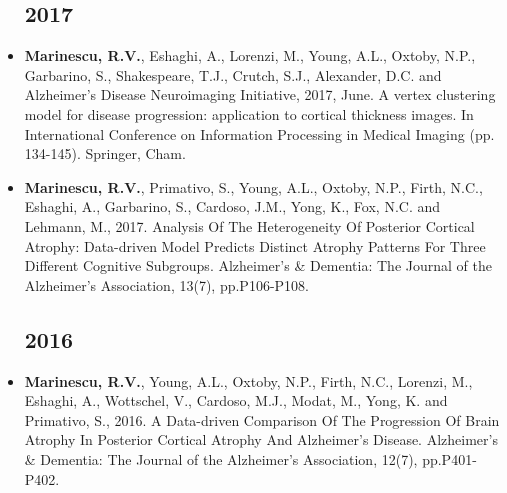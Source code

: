 \documentclass[a4paper,10pt]{article} %
\begin{document}
\begin{itemize}
\subsection*{2017}
\item[\talk] \textbf{Marinescu, R.V.}, Eshaghi, A., Lorenzi, M., Young, A.L., Oxtoby, N.P., Garbarino, S., Shakespeare, T.J., Crutch, S.J., Alexander, D.C. and Alzheimer’s Disease Neuroimaging Initiative, 2017, June. A vertex clustering model for disease progression: application to cortical thickness images. In International Conference on Information Processing in Medical Imaging (pp. 134-145). Springer, Cham.
\item[\poster] \textbf{Marinescu, R.V.}, Primativo, S., Young, A.L., Oxtoby, N.P., Firth, N.C., Eshaghi, A., Garbarino, S., Cardoso, J.M., Yong, K., Fox, N.C. and Lehmann, M., 2017. Analysis Of The Heterogeneity Of Posterior Cortical Atrophy: Data-driven Model Predicts Distinct Atrophy Patterns For Three Different Cognitive Subgroups. Alzheimer's \& Dementia: The Journal of the Alzheimer's Association, 13(7), pp.P106-P108.
\subsection*{2016}
\item[\poster] \textbf{Marinescu, R.V.}, Young, A.L., Oxtoby, N.P., Firth, N.C., Lorenzi, M., Eshaghi, A., Wottschel, V., Cardoso, M.J., Modat, M., Yong, K. and Primativo, S., 2016. A Data-driven Comparison Of The Progression Of Brain Atrophy In Posterior Cortical Atrophy And Alzheimer's Disease. Alzheimer's \& Dementia: The Journal of the Alzheimer's Association, 12(7), pp.P401-P402.
\end{itemize}

\end{document}
